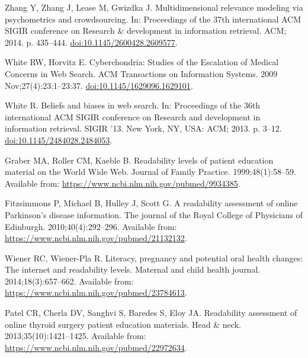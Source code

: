 \documentclass[10pt,a4paper]{article}
\begin{document}
\begin{thebibliography}{10}

	Zhang Y, Zhang J, Lease M, Gwizdka J.
	\newblock Multidimensional relevance modeling via psychometrics and
	crowdsourcing.
	\newblock In: Proceedings of the 37th international ACM SIGIR conference on
	Research \& development in information retrieval. ACM; 2014. p. 435--444.
	\newblock \href {http://dx.doi.org/10.1145/2600428.2609577}
	{doi:10.1145/2600428.2609577}.
	
	White RW, Horvitz E.
	\newblock Cyberchondria: Studies of the Escalation of Medical Concerns in Web
	Search.
	\newblock ACM Transactions on Information Systems. 2009 Nov;27(4):23:1--23:37.
	\newblock \href {http://dx.doi.org/10.1145/1629096.1629101}
	{doi:10.1145/1629096.1629101}.
	
	White R.
	\newblock Beliefs and biases in web search.
	\newblock In: Proceedings of the 36th international ACM SIGIR conference on
	Research and development in information retrieval. SIGIR '13. New York, NY,
	USA: ACM; 2013. p. 3--12.
	\newblock \href {http://dx.doi.org/10.1145/2484028.2484053}
	{doi:10.1145/2484028.2484053}.
	
	Graber MA, Roller CM, Kaeble B.
	\newblock Readability levels of patient education material on the World Wide
	Web.
	\newblock Journal of Family Practice. 1999;48(1):58--59.
	\newblock Available from: \url{https://www.ncbi.nlm.nih.gov/pubmed/9934385}.
	
	Fitzsimmons P, Michael B, Hulley J, Scott G.
	\newblock A readability assessment of online Parkinson's disease information.
	\newblock The journal of the Royal College of Physicians of Edinburgh.
	2010;40(4):292--296.
	\newblock Available from: \url{https://www.ncbi.nlm.nih.gov/pubmed/21132132}.
	
	Wiener RC, Wiener-Pla R.
	\newblock Literacy, pregnancy and potential oral health changes: The internet
	and readability levels.
	\newblock Maternal and child health journal. 2014;18(3):657--662.
	\newblock Available from: \url{https://www.ncbi.nlm.nih.gov/pubmed/23784613}.
	
	Patel CR, Cherla DV, Sanghvi S, Baredes S, Eloy JA.
	\newblock Readability assessment of online thyroid surgery patient education
	materials.
	\newblock Head \& neck. 2013;35(10):1421--1425.
	\newblock Available from: \url{https://www.ncbi.nlm.nih.gov/pubmed/22972634}.
	

\end{thebibliography}
\end{document}
